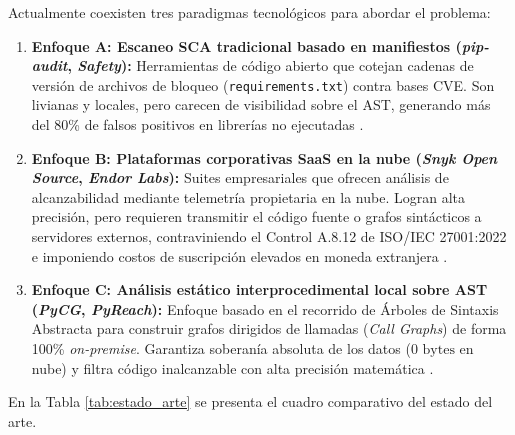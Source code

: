Actualmente coexisten tres paradigmas tecnológicos para abordar el problema:
\begin{enumerate}[leftmargin=1.27cm, label=\alph*)]
    \item \textbf{Enfoque A: Escaneo SCA tradicional basado en manifiestos (\textit{pip-audit}, \textit{Safety}):} Herramientas de código abierto que cotejan cadenas de versión de archivos de bloqueo (\texttt{requirements.txt}) contra bases CVE. Son livianas y locales, pero carecen de visibilidad sobre el AST, generando más del 80\% de falsos positivos en librerías no ejecutadas \parencite{pashchenko2022vuln4real, vargas2022analisis}. %
    \item \textbf{Enfoque B: Plataformas corporativas SaaS en la nube (\textit{Snyk Open Source}, \textit{Endor Labs}):} Suites empresariales que ofrecen análisis de alcanzabilidad mediante telemetría propietaria en la nube. Logran alta precisión, pero requieren transmitir el código fuente o grafos sintácticos a servidores externos, contraviniendo el Control A.8.12 de ISO/IEC 27001:2022 e imponiendo costos de suscripción elevados en moneda extranjera \parencite{endorlabs2023state, ladisa2023sok}. %
    \item \textbf{Enfoque C: Análisis estático interprocedimental local sobre AST (\textit{PyCG}, \textit{PyReach}):} Enfoque basado en el recorrido de Árboles de Sintaxis Abstracta para construir grafos dirigidos de llamadas (\textit{Call Graphs}) de forma 100\% \textit{on-premise}. Garantiza soberanía absoluta de los datos ($0\text{ bytes}$ en nube) y filtra código inalcanzable con alta precisión matemática \parencite{salis2021pycg, ryder1979constructing}. %
\end{enumerate}

En la Tabla \ref{tab:estado_arte} se presenta el cuadro comparativo del estado del arte.

